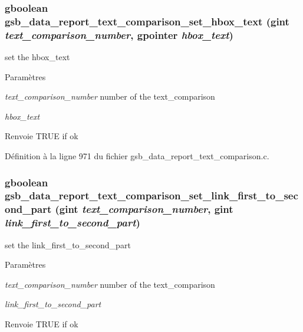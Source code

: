 \subsubsection[{gsb\_\-data\_\-report\_\-text\_\-comparison\_\-set\_\-hbox\_\-text}]{\setlength{\rightskip}{0pt plus 5cm}gboolean gsb\_\-data\_\-report\_\-text\_\-comparison\_\-set\_\-hbox\_\-text (gint {\em text\_\-comparison\_\-number}, \/  gpointer {\em hbox\_\-text})}\label{gsb__data__report__text__comparison_8h_a075e9be17ce49c0b71e1795cbe661991}
set the hbox\_\-text


\begin{DoxyParams}{Paramètres}
\item[{\em text\_\-comparison\_\-number}]number of the text\_\-comparison \item[{\em hbox\_\-text}]\end{DoxyParams}
\begin{DoxyReturn}{Renvoie}
TRUE if ok 
\end{DoxyReturn}


Définition à la ligne 971 du fichier gsb\_\-data\_\-report\_\-text\_\-comparison.c.

\subsubsection[{gsb\_\-data\_\-report\_\-text\_\-comparison\_\-set\_\-link\_\-first\_\-to\_\-second\_\-part}]{\setlength{\rightskip}{0pt plus 5cm}gboolean gsb\_\-data\_\-report\_\-text\_\-comparison\_\-set\_\-link\_\-first\_\-to\_\-second\_\-part (gint {\em text\_\-comparison\_\-number}, \/  gint {\em link\_\-first\_\-to\_\-second\_\-part})}\label{gsb__data__report__text__comparison_8h_a21e8035c4f8bec87320b814d6251a7d4}
set the link\_\-first\_\-to\_\-second\_\-part


\begin{DoxyParams}{Paramètres}
\item[{\em text\_\-comparison\_\-number}]number of the text\_\-comparison \item[{\em link\_\-first\_\-to\_\-second\_\-part}]\end{DoxyParams}
\begin{DoxyReturn}{Renvoie}
TRUE if ok 
\end{DoxyReturn}


